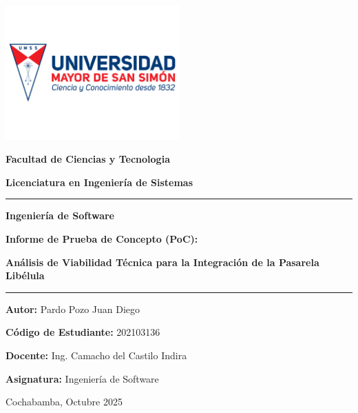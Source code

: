 \begin{titlepage}
    \thispagestyle{empty}
    \begin{center}
        \vspace*{-3cm}
        
        \includegraphics[width=0.5\textwidth]{resources/images/logos/logoUMSS.png} 

        \normalsize{
            \textbf{Facultad de Ciencias y Tecnologia}\par
            \textbf{Licenciatura en Ingeniería de Sistemas}\par
        }

        \vspace*{2cm}
        \rule{\textwidth}{0.2pt}\par

        \vspace*{0.5cm}
        \Huge{
            \textbf{Ingeniería de Software}\par
        }
        \Large{
            \textbf{Informe de Prueba de Concepto (PoC):}\par
            \textbf{Análisis de Viabilidad Técnica para la Integración de la Pasarela Libélula}\par
        }   
        \vspace*{0.5cm} 

        \rule{\textwidth}{0.2pt}\par
        \vspace*{2cm}

        \normalsize{
            \textbf{Autor: }Pardo Pozo Juan Diego\par
            \textbf{Código de Estudiante: } 202103136\par
            \textbf{Docente: }Ing. Camacho del Castilo Indira\par
            \textbf{Asignatura: }Ingeniería de Software\par
        }

        \vfill

        \normalsize{
            Cochabamba, Octubre 2025
        }
    \end{center}
\end{titlepage}